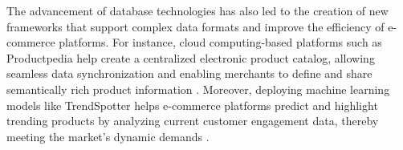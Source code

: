 The advancement of database technologies has also led to the creation of new frameworks that support complex data formats and improve the efficiency of e-commerce platforms. For instance, cloud computing-based platforms such as Productpedia help create a centralized electronic product catalog, allowing seamless data synchronization and enabling merchants to define and share semantically rich product information \cite{10.1007/978-3-319-20895-4_34}. Moreover, deploying machine learning models like TrendSpotter helps e-commerce platforms predict and highlight trending products by analyzing current customer engagement data, thereby meeting the market's dynamic demands \cite{10.1145/3583780.3615503}.